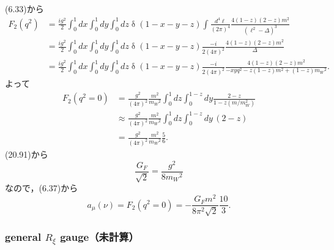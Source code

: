 (6.33)から
\begin{align*}
  F_2(q^2) &= \frac{ig^2}{2} \int_0^1 dx \int_0^1 dy \int_0^1 dz \mathop{\delta}(1-x-y-z) \int\frac{d^4\ell}{(2\pi)^4} \frac{4(1-z)(2-z) m^2}{(\ell^2-\Delta)^3} \\
  &= \frac{ig^2}{2}  \int_0^1 dx \int_0^1 dy \int_0^1 dz \mathop{\delta}(1-x-y-z) \frac{-i}{2(4\pi)^2} \frac{4(1-z)(2-z) m^2}{\Delta} \\
  &= \frac{ig^2}{2}  \int_0^1 dx \int_0^1 dy \int_0^1 dz \mathop{\delta}(1-x-y-z) \frac{-i}{2(4\pi)^2} \frac{4(1-z)(2-z) m^2}{- xyq^2 - z(1-z) m^2 + (1-z) m_W{}^2} .
\end{align*}
よって
\begin{align*}
  F_2(q^2=0) &= \frac{g^2}{(4\pi)^2} \frac{m^2}{m_W{}^2} \int_0^1 dz \int_0^{1-z} dy \frac{2-z}{1-z(m/m_W^2)} \\
  &\approx \frac{g^2}{(4\pi)^2} \frac{m^2}{m_W{}^2} \int_0^1 dz \int_0^{1-z} dy \, (2-z) \\
  &= \frac{g^2}{(4\pi)^2} \frac{m^2}{m_W{}^2} \frac{5}{6} .
\end{align*}
(20.91)から
\[ \frac{G_F}{\sqrt{2}} = \frac{g^2}{8m_W{}^2} \]
なので，(6.37)から
\[ a_\mu(\nu) = F_2(q^2=0) = - \frac{G_Fm^2}{8\pi^2\sqrt{2}} \frac{10}{3} . \]

\subsubsection{general \(R_\xi\) gauge（未計算）}
\begin{center}
\end{center}

